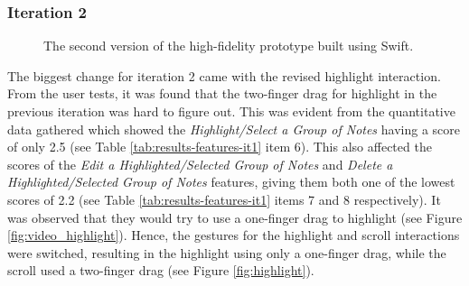 			\subsubsection{Iteration 2}

				\begin{figure}[H]
					\centering
				    \caption{The second version of the high-fidelity prototype built using Swift.}
				    \label{fig:flow_it2}
				\end{figure} 

				The biggest change for iteration 2 came with the revised highlight interaction. From the user tests, it was found that the two-finger drag for highlight in the previous iteration was hard to figure out. This was evident from the quantitative data gathered which showed the \textit{Highlight/Select a Group of Notes} having a score of only 2.5 (see Table \ref{tab:results-features-it1} item 6). This also affected the scores of the \textit{Edit a Highlighted/Selected Group of Notes} and \textit{Delete a Highlighted/Selected Group of Notes} features, giving them both one of the lowest scores of 2.2 (see Table \ref{tab:results-features-it1} items 7 and 8 respectively). It was observed that they would try to use a one-finger drag to highlight (see Figure \ref{fig:video_highlight}). Hence, the gestures for the highlight and scroll interactions were switched, resulting in the highlight using only a one-finger drag, while the scroll used a two-finger drag (see Figure \ref{fig:highlight}). 

